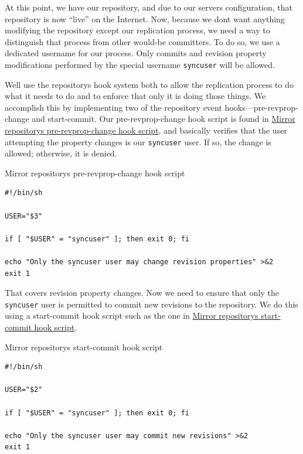 At this point, we have our repository, and due to our
server\textquotesingle s configuration, that repository is now ``live''
on the Internet. Now, because we don\textquotesingle t want anything
modifying the repository except our replication process, we need a way
to distinguish that process from other would-be committers. To do so, we
use a dedicated username for our process. Only commits and revision
property modifications performed by the special username
\texttt{syncuser} will be allowed.

We\textquotesingle ll use the repository\textquotesingle s hook system
both to allow the replication process to do what it needs to do and to
enforce that only it is doing those things. We accomplish this by
implementing two of the repository event hooks---pre-revprop-change and
start-commit. Our pre-revprop-change hook script is found in
\hyperref[svn.reposadmin.maint.replication.pre-revprop-change]{Mirror
repository\textquotesingle s pre-revprop-change hook script}, and
basically verifies that the user attempting the property changes is our
\texttt{syncuser} user. If so, the change is allowed; otherwise, it is
denied.

\protect{}\label{svn.reposadmin.maint.replication.pre-revprop-change}
Mirror repository\textquotesingle s pre-revprop-change hook script

\begin{verbatim}
#!/bin/sh 

USER="$3"

if [ "$USER" = "syncuser" ]; then exit 0; fi

echo "Only the syncuser user may change revision properties" >&2
exit 1
\end{verbatim}

That covers revision property changes. Now we need to ensure that only
the \texttt{syncuser} user is permitted to commit new revisions to the
repository. We do this using a start-commit hook script such as the one
in \hyperref[svn.reposadmin.maint.replication.start-commit]{Mirror
repository\textquotesingle s start-commit hook script}.

\protect{}\label{svn.reposadmin.maint.replication.start-commit}
Mirror repository\textquotesingle s start-commit hook script

\begin{verbatim}
#!/bin/sh 

USER="$2"

if [ "$USER" = "syncuser" ]; then exit 0; fi

echo "Only the syncuser user may commit new revisions" >&2
exit 1
\end{verbatim}

